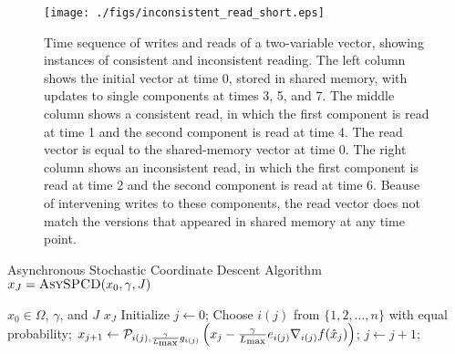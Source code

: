 \documentclass{siamltex}
\begin{document}
\begin{figure}[t!]
\center
\vspace{-5mm}
\texttt{[image: ./figs/inconsistent\_read\_short.eps]}
\vspace{-20mm}
\caption{Time sequence of writes and reads of a two-variable vector,
  showing instances of consistent and inconsistent reading. The left
  column shows the initial vector at time $0$, stored in shared
  memory, with updates to single components at times 3, 5, and 7. The
  middle column shows a consistent read, in which the first component
  is read at time 1 and the second component is read at time 4.  The
  read vector is equal to the shared-memory vector at time 0.  The
  right column shows an inconsistent read, in which the first
  component is read at time 2 and the second component is read at time
  6. Beause of intervening writes to these components, the read vector
  does not match the versions that appeared in shared memory at any
  time point.}
\label{fig_inconsistentread}
\end{figure} 

\begin{algorithm}
\caption{Asynchronous Stochastic Coordinate Descent Algorithm $x_{J}={\mbox{\sc AsySPCD}}(x_0, \gamma, J)$}
\label{alg_ascd}
\begin{algorithmic}[1]
\REQUIRE $x_0\in\Omega$, $\gamma$, and $J$
\ENSURE $x_{J}$
\STATE Initialize $j \leftarrow 0$;
\STATE Choose $i(j)$ from $\{1,2,\dotsc,n\}$ with equal probability;
\STATE $x_{j+1} \leftarrow {\mathcal{P}}_{i(j),{\gamma\over {L_{\mbox{\rm\scriptsize max}}}}g_{i(j)}}\left(x_j-\frac{\gamma}{L_{\mbox{\rm\scriptsize max}}} e_{i(j)} \nabla_{i(j)}f({\hat{x}}_{j})\right)$; \label{step_proj}
\STATE $j \leftarrow  j +1$;
\ENDWHILE
\end{algorithmic}
\end{algorithm}
\end{document}
